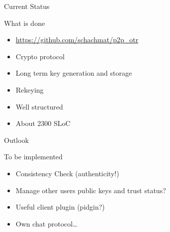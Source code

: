 \begin{frame}{Current Status}
	\begin{block}{What is done}
		\begin{itemize}
			\item \url{https://github.com/schachmat/p2p_otr}
			\item Crypto protocol
			\item Long term key generation and storage
			\item Rekeying
			\item Well structured
			\item About 2300 SLoC
		\end{itemize}
	\end{block}
\end{frame}

\begin{frame}{Outlook}
	\begin{block}{To be implemented}
		\begin{itemize}
			\item Consistency Check (authenticity!)
			\item Manage other users public keys and trust status?
			\item Useful client plugin (pidgin?)
			\item Own chat protocol…
		\end{itemize}
	\end{block}
\end{frame}

